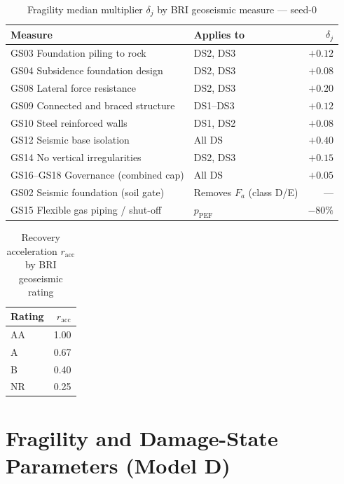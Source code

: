 \documentclass[11pt,a4paper]{article}
\begin{document}
\begin{table}[H]
  \centering
  \caption{Fragility median multiplier $\delta_j$ by BRI geoseismic measure --- seed-0}
  \begin{tabular}{llr}
    \toprule
    \textbf{Measure} & \textbf{Applies to} & \textbf{$\delta_j$} \\
    \midrule
    GS03 Foundation piling to rock        & DS2, DS3 & $+0.12$ \\
    GS04 Subsidence foundation design     & DS2, DS3 & $+0.08$ \\
    GS08 Lateral force resistance         & DS2, DS3 & $+0.20$ \\
    GS09 Connected and braced structure   & DS1--DS3 & $+0.12$ \\
    GS10 Steel reinforced walls           & DS1, DS2 & $+0.08$ \\
    GS12 Seismic base isolation           & All DS   & $+0.40$ \\
    GS14 No vertical irregularities       & DS2, DS3 & $+0.15$ \\
    GS16--GS18 Governance (combined cap)  & All DS   & $+0.05$ \\
    \midrule
    GS02 Seismic foundation (soil gate)   & Removes $F_a$ (class D/E) & --- \\
    GS15 Flexible gas piping / shut-off    & $p_{\text{PEF}}$ & $-80\%$ \\
    \bottomrule
  \end{tabular}
\end{table}

\begin{table}[H]
  \centering
  \caption{Recovery acceleration $r_{\text{acc}}$ by BRI geoseismic rating}
  \begin{tabular}{lr}
    \toprule
    \textbf{Rating} & \textbf{$r_{\text{acc}}$} \\
    \midrule
    AA & 1.00 \\
    A  & 0.67 \\
    B  & 0.40 \\
    NR & 0.25 \\
    \bottomrule
  \end{tabular}
\end{table}

\section{Fragility and Damage-State Parameters (Model D)}\label{app:frag}
\end{document}
